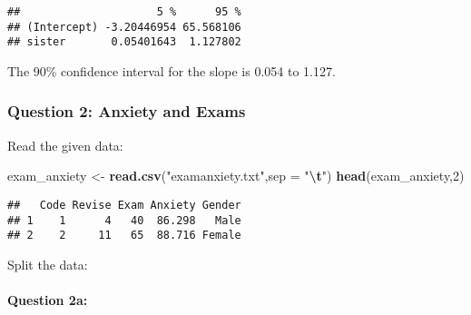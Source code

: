 \documentclass[
]{article}
\newenvironment{Shaded}{\begin{snugshade}}{\end{snugshade}}
\newcommand{\AttributeTok}[1]{\textcolor[rgb]{0.13,0.29,0.53}{#1}}
\newcommand{\DecValTok}[1]{\textcolor[rgb]{0.00,0.00,0.81}{#1}}
\newcommand{\FunctionTok}[1]{\textcolor[rgb]{0.13,0.29,0.53}{\textbf{#1}}}
\newcommand{\NormalTok}[1]{#1}
\newcommand{\OtherTok}[1]{\textcolor[rgb]{0.56,0.35,0.01}{#1}}
\newcommand{\SpecialCharTok}[1]{\textcolor[rgb]{0.81,0.36,0.00}{\textbf{#1}}}
\newcommand{\StringTok}[1]{\textcolor[rgb]{0.31,0.60,0.02}{#1}}
\begin{document}
\begin{verbatim}
##                     5 %      95 %
## (Intercept) -3.20446954 65.568106
## sister       0.05401643  1.127802
\end{verbatim}

The 90\% confidence interval for the slope is 0.054 to 1.127.

\hypertarget{question-2-anxiety-and-exams}{%
\subsubsection{Question 2: Anxiety and
Exams}\label{question-2-anxiety-and-exams}}

Read the given data:

\begin{Shaded}
\begin{Highlighting}[]
\NormalTok{exam\_anxiety }\OtherTok{\textless{}{-}} \FunctionTok{read.csv}\NormalTok{(}\StringTok{"examanxiety.txt"}\NormalTok{,}\AttributeTok{sep =} \StringTok{"}\SpecialCharTok{\textbackslash{}t}\StringTok{"}\NormalTok{)}
\FunctionTok{head}\NormalTok{(exam\_anxiety,}\DecValTok{2}\NormalTok{)}
\end{Highlighting}
\end{Shaded}

\begin{verbatim}
##   Code Revise Exam Anxiety Gender
## 1    1      4   40  86.298   Male
## 2    2     11   65  88.716 Female
\end{verbatim}

Split the data:

\begin{Shaded}
\end{Shaded}

\hypertarget{question-2a}{%
\paragraph{Question 2a:}\label{question-2a}}
\end{document}
